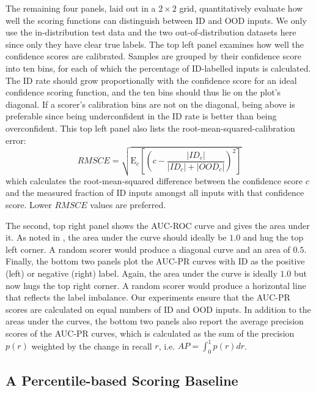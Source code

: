 \noindent The remaining four panels, laid out in a $2 \times 2$ grid, quantitatively evaluate how well the scoring functions can distinguish between ID and OOD inputs. We only use the in-distribution test data and the two out-of-distribution datasets here since only they have clear true labels. The top left panel examines how well the confidence scores are calibrated. Samples are grouped by their confidence score into ten bins, for each of which the percentage of ID-labelled inputs is calculated. The ID rate should grow proportionally with the confidence score for an ideal confidence scoring function, and the ten bins should thus lie on the plot's diagonal. If a scorer's calibration bins are not on the diagonal, being above is preferable since being underconfident in the ID rate is better than being overconfident. This top left panel also lists the root-mean-squared-calibration error:
\begin{equation*}
    RMSCE = \sqrt{\text{E}_{c}\left[\left(c - \frac{|ID_c|}{|ID_c| + |OOD_c|} \right)^2\right]}
\end{equation*}
\noindent which calculates the root-mean-squared difference between the confidence score $c$ and the measured fraction of ID inputs amongst all inputs with that confidence score. Lower $RMSCE$ values are preferred.

\newpar The second, top right panel shows the AUC-ROC curve and gives the area under it. As noted in , the area under the curve should ideally be $1.0$ and hug the top left corner. A random scorer would produce a diagonal curve and an area of $0.5$. Finally, the bottom two panels plot the AUC-PR curves with ID as the positive (left) or negative (right) label. Again, the area under the curve is ideally $1.0$ but now hugs the top right corner. A random scorer would produce a horizontal line that reflects the label imbalance. Our experiments ensure that the AUC-PR scores are calculated on equal numbers of ID and OOD inputs. In addition to the areas under the curves, the bottom two panels also report the average precision scores of the AUC-PR curves, which is calculated as the sum of the precision $p(r)$ weighted by the change in recall $r$, i.e. $AP = \int_{0}^{1}p(r) dr$.

\subsection{A Percentile-based Scoring Baseline} \label{txt:percentile-confidence}

